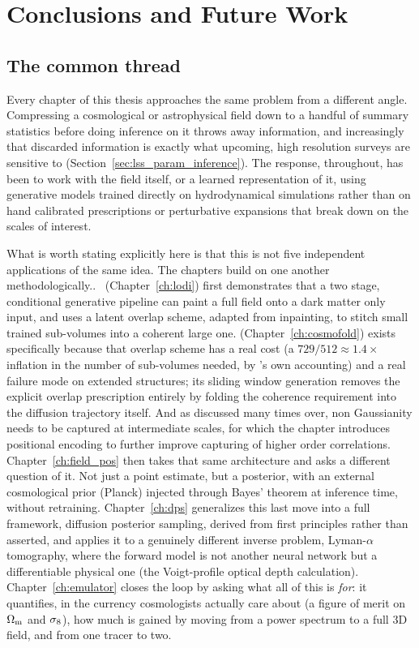 \chapter{Conclusions and Future Work}
\label{ch:conclusion}

\section{The common thread}
\label{sec:conclusion_thread}

Every chapter of this thesis approaches the same problem from a different angle. Compressing a cosmological or astrophysical field down to a handful of summary statistics before doing inference on it throws away information, and increasingly that discarded information is exactly what upcoming, high resolution surveys are sensitive to (Section~\ref{sec:lss_param_inference}). The response, throughout, has been to work with the field itself, or a learned representation of it, using generative models trained directly on hydrodynamical simulations rather than on hand calibrated prescriptions or perturbative expansions that break down on the scales of interest.

What is worth stating explicitly here is that this is not five independent applications of the same idea. The chapters build on one another methodologically.. \LODI\ (Chapter~\ref{ch:lodi}) first demonstrates that a two stage, conditional generative pipeline can paint a full field onto a dark matter only input, and uses a latent overlap scheme, adapted from inpainting, to stitch small trained sub-volumes into a coherent large one. \FOLD (Chapter~\ref{ch:cosmofold}) exists specifically because that overlap scheme has a real cost (a $729/512\approx 1.4\times$ inflation in the number of sub-volumes needed, by \LODI's own accounting) and a real failure mode on extended structures; its sliding window generation removes the explicit overlap prescription entirely by folding the coherence requirement into the diffusion trajectory itself. And as discussed many times over, non Gaussianity needs to be captured at intermediate scales, for which the chapter introduces positional encoding to further improve capturing of higher order correlations. Chapter~\ref{ch:field_pos} then takes that same architecture and asks a different question of it. Not just a point estimate, but a posterior, with an external cosmological prior (Planck) injected through Bayes' theorem at inference time, without retraining. Chapter~\ref{ch:dps} generalizes this last move into a full framework, diffusion posterior sampling, derived from first principles rather than asserted, and applies it to a genuinely different inverse problem, Lyman-$\alpha$ tomography, where the forward model is not another neural network but a differentiable physical one (the Voigt-profile optical depth calculation). Chapter~\ref{ch:emulator} closes the loop by asking what all of this is \emph{for}: it quantifies, in the currency cosmologists actually care about (a figure of merit on $\Omega_\mathrm{m}$ and $\sigma_8$), how much is gained by moving from a power spectrum to a full 3D field, and from one tracer to two.

